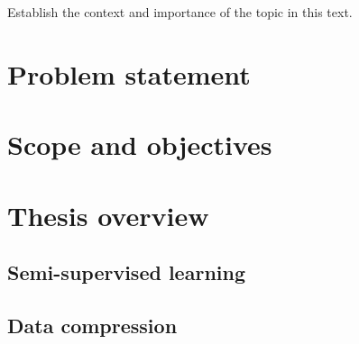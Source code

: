 Establish the context and importance of the topic in this text.

\section{Problem statement}

\section{Scope and objectives}

\section{Thesis overview}

\subsection{Semi-supervised learning}

\subsection{Data compression}

